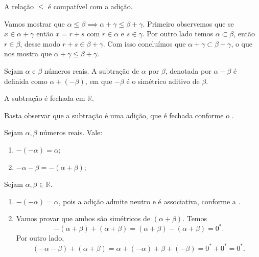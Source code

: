 \documentclass[../main.tex]{subfiles}
\begin{document}
\begin{teo}\label{reais-teo-somaCompativelOrdem}
    A relação $\leq$ é compatível com a adição.
\end{teo}
\begin{dem}
    Vamos mostrar que $\alpha \leq \beta \implies \alpha + \gamma \leq \beta + \gamma$.
    Primeiro observemos que se $x \in \alpha + \gamma$ então $x = r + s$ com $r \in \alpha$ e $s \in \gamma$. Por outro lado temos $\alpha \subset \beta$, então $r \in \beta$, desse modo $r + s \in \beta + \gamma$. Com isso concluímos que $\alpha + \gamma \subset \beta + \gamma$, o que nos mostra que $\alpha + \gamma \leq \beta + \gamma$.
\end{dem}
\begin{defi}
    Sejam $\alpha$ e $\beta$ números reais. A subtração de $\alpha$ por $\beta$, denotada por $\alpha - \beta$ é definida como $\alpha + (-\beta)$, em que $-\beta$ é o simétrico aditivo de $\beta$. 
\end{defi}
\begin{prop}
    A subtração é fechada em $\mathbb{R}$.
\end{prop}
\begin{dem}
    Basta observar que a subtração é uma adição, que é fechada conforme o .
\end{dem}

\begin{teo}\label{reais-teo-regraSinais}
    Sejam $\alpha, \beta$ números reais. Vale:
    \begin{enumerate}[label=(\roman*)]
        \item $-(-\alpha) = \alpha$;
        \item $-\alpha - \beta = -(\alpha + \beta)$;
    \end{enumerate}
\end{teo}
\begin{dem}
    Sejam $\alpha, \beta \in \mathbb{R}$.
    \begin{enumerate}[label=(\roman*)]
        \item $-(-\alpha) = \alpha$, pois a adição admite neutro e é associativa, conforme a . 
        \item Vamos provar que ambos são simétricos de $(\alpha + \beta)$. Temos 
        \[ -(\alpha + \beta) + (\alpha + \beta) = (\alpha + \beta) - (\alpha + \beta) = 0^*. \] 
        Por outro lado, \[ (-\alpha - \beta) + (\alpha + \beta) = \alpha + (- \alpha) + \beta +(- \beta) = 0^*+0^*=0^*. \]
    \end{enumerate}    
\end{dem}
\end{document}
